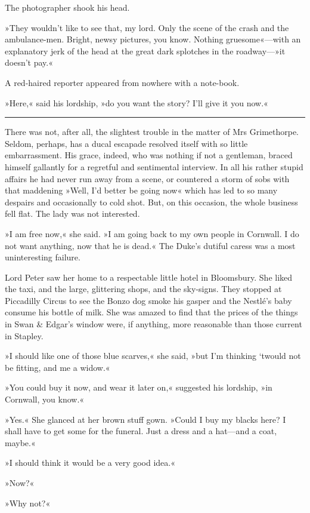 The photographer shook his head.

»They wouldn't like to see that, my lord. Only the scene of the crash and the ambulance-men. Bright, newsy pictures, you know. Nothing gruesome«—with an explanatory jerk of the head at the great dark splotches in the roadway—»it doesn't pay.«

A red-haired reporter appeared from nowhere with a note-book.

»Here,« said his lordship, »do you want the story? I'll give it you now.« 

\noindent\hfil\rule{0.5\textwidth}{.4pt}\hfil 

There was not, after all, the slightest trouble in the matter of Mrs  Grimethorpe. Seldom, perhaps, has a ducal escapade resolved itself with so little embarrassment. His grace, indeed, who was nothing if not a gentleman, braced himself gallantly for a regretful and sentimental interview. In all his rather stupid affairs he had never run away from a scene, or countered a storm of sobs with that maddening »Well, I'd better be going now« which has led to so many despairs and occasionally to cold shot. But, on this occasion, the whole business fell flat. The lady was not interested.

»I am free now,« she said. »I am going back to my own people in Cornwall. I do not want anything, now that he is dead.« The Duke's dutiful caress was a most uninteresting failure.

Lord Peter saw her home to a respectable little hotel in Bloomsbury.  She liked the taxi, and the large, glittering shops, and the sky-signs.  They stopped at Piccadilly Circus to see the Bonzo dog smoke his gasper and the Nestlé's baby consume his bottle of milk. She was amazed to find that the prices of the things in Swan \& Edgar's window were, if anything, more reasonable than those current in Stapley.

»I should like one of those blue scarves,« she said, »but I'm thinking `twould not be fitting, and me a widow.«

»You could buy it now, and wear it later on,« suggested his lordship, »in Cornwall, you know.«

»Yes.« She glanced at her brown stuff gown. »Could I buy my blacks here? I shall have to get some for the funeral. Just a dress and a hat—and a coat, maybe.«

»I should think it would be a very good idea.«

»Now?«

»Why not?«

